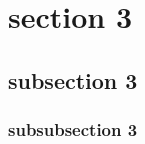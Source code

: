 \section{section 3} \label{sec3}

\subsection{subsection 3} \label{sec3:1}

\subsubsection{subsubsection 3} \label{sec3:1:1}

\blindtext[1]
